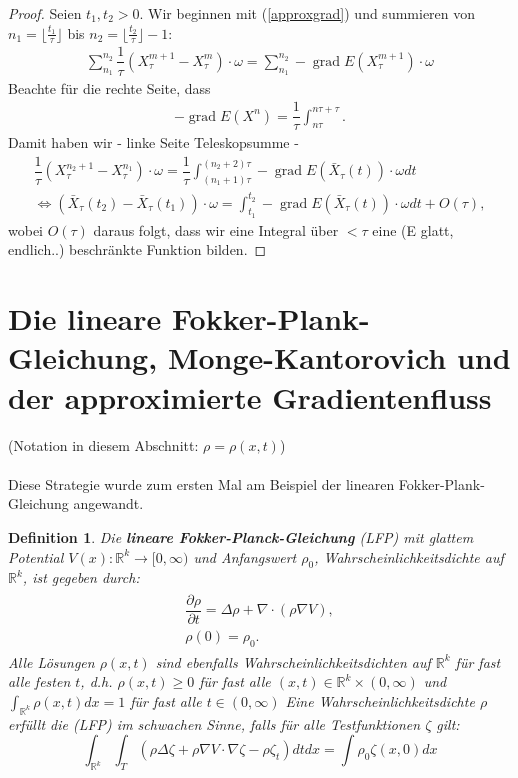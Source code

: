 \documentclass[11pt,a4paper,notitlepage]{scrreprt}
\newcommand{\RR}{\mathbb{R}}
\newcommand{\grad}{\operatorname{grad}}
\newtheorem{defi}{Definition}[section]
\begin{document}
\begin{proof}
Seien $t_1,t_2>0$. Wir beginnen mit (\ref{approxgrad}) und summieren von $n_1=\lfloor\frac{t_1}{\tau}\rfloor$ bis $n_2=\lfloor\frac{t_2}{\tau}\rfloor-1$:\\
\begin{align}
\sum_{n_1}^{n_2}\dfrac{1}{\tau} (X_\tau^{m+1}-X_\tau^m)\cdot\omega=\sum_{n_1}^{n_2}-\grad E(X_\tau^{m+1})\cdot\omega
\end{align}
Beachte für die rechte Seite, dass  
\begin{align*}
-\grad E(X^n)=\dfrac{1}{\tau}\int_{n\tau}^{n\tau+\tau}.
\end{align*}
Damit haben wir - linke Seite Teleskopsumme -
\begin{align}
\dfrac{1}{\tau}(X_\tau^{n_2+1}-X_\tau^{n_1})\cdot\omega=\dfrac{1}{\tau}\int_{(n_1+1)\tau}^{(n_2+2)\tau}-\grad E(\bar{X}_\tau(t))\cdot\omega dt\\
\Leftrightarrow (\bar{X}_\tau(t_2)-\bar{X}_\tau(t_1))\cdot\omega = \int_{t_1}^{t_2}-\grad E(\bar{X}_\tau(t))\cdot\omega dt+O(\tau),
\end{align}
wobei $O(\tau)$ daraus folgt, dass wir eine Integral über $<\tau$ eine (E glatt, endlich..) beschränkte Funktion bilden. 

\end{proof}

 

\newpage
\section{Die lineare Fokker-Plank-Gleichung, Monge-Kantorovich und der approximierte Gradientenfluss}

(Notation in diesem Abschnitt: $\rho=\rho(x,t)$)\\\\
Diese Strategie wurde zum ersten Mal am Beispiel der linearen Fokker-Plank-Gleichung angewandt. \\
\begin{defi}
Die \textbf{lineare Fokker-Planck-Gleichung} (LFP) mit glattem Potential $V(x):\RR^k\to[0,\infty)$ und Anfangswert $\rho_0$, Wahrscheinlichkeitsdichte auf $\RR^k$, ist gegeben durch:
\begin{eqnarray}
\begin{split}
\dfrac{\partial\rho}{\partial t}=\Delta\rho+\nabla\cdot(\rho\nabla V),\\
\rho(0)=\rho_0.\label{FP}
\end{split}
\end{eqnarray}
Alle Lösungen $\rho(x,t)$ sind ebenfalls Wahrscheinlichkeitsdichten auf $\RR^k$ für fast alle festen $t$, d.h. $\rho(x,t)\geq 0$ für fast alle $(x,t)\in \RR^k\times(0,\infty)$  und $\int_{\RR^k}\rho(x,t)dx=1$ für fast alle $t\in(0,\infty)$
Eine Wahrscheinlichkeitsdichte $\rho$ erfüllt die (LFP) im schwachen Sinne, falls für alle Testfunktionen $\zeta$ gilt:
\begin{equation}
\int_{\RR^k} \int_T (\rho\Delta\zeta+\rho\nabla V\cdot\nabla\zeta -\rho\zeta_t) dt dx=\int\rho_0\zeta(x,0)dx \label{FPweak}
\end{equation}
\end{defi}
\end{document}

